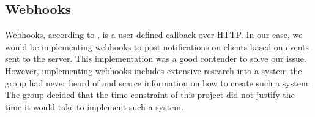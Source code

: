 \subsection{Webhooks}
Webhooks, according to \cite{webhooks}, is a user-defined callback over HTTP. In our case, we would be implementing webhooks to post notifications on clients based on events sent to the server. This implementation was a good contender to solve our issue. However, implementing webhooks includes extensive research into a system the group had never heard of and scarce information on how to create such a system. The group decided that the time constraint of this project did not justify the time it would take to implement such a system.

